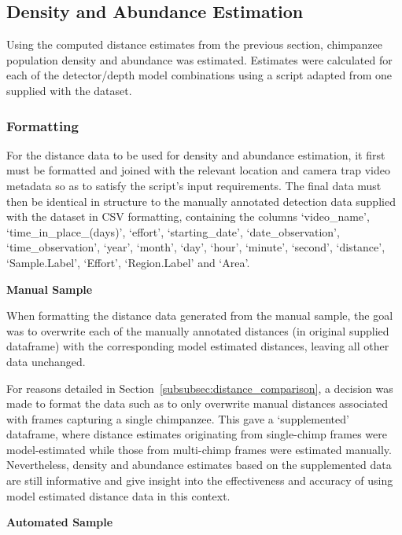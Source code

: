 \subsection{Density and Abundance Estimation}

Using the computed distance estimates from the previous section, chimpanzee population
density and abundance was estimated.
Estimates were calculated for each of the detector/depth model combinations using a
script adapted from one supplied with the dataset.

\subsubsection{Formatting}\label{subsubsec:formatting}

For the distance data to be used for density and abundance estimation, it first must be
formatted and joined with the relevant location and camera trap video metadata so as to
satisfy the script's input requirements.
The final data must then be identical in structure to the manually annotated
detection data supplied with the dataset in CSV formatting, containing the columns
`video\_name', `time\_in\_place\_(days)', `effort', `starting\_date', `date\_observation',
`time\_observation', `year', `month', `day', `hour', `minute', `second', `distance', `Sample.Label',
`Effort', `Region.Label' and `Area'.

\vspace{5mm}
\textbf{Manual Sample}

When formatting the distance data generated from the manual sample, the goal was to
overwrite each of the manually annotated distances (in original supplied dataframe)
with the corresponding model estimated distances, leaving all other data unchanged.

For reasons detailed in Section~\ref{subsubsec:distance_comparison}, a decision was
made to format the data such as to only overwrite manual distances associated with
frames capturing a single chimpanzee.
This gave a `supplemented' dataframe, where distance estimates originating from
single-chimp frames were model-estimated while those from multi-chimp frames were
estimated manually.
Nevertheless, density and abundance estimates based on the supplemented data are still
informative and give insight into the effectiveness and accuracy of using model estimated
distance data in this context.

\vspace{5mm}
\textbf{Automated Sample}


